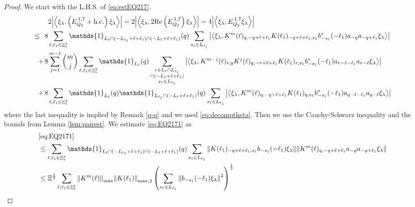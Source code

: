 \documentclass[12pt,a4paper]{article}
\numberwithin{equation}{section}
\newcommand{\1}{\mathbb{I}}
\DeclareMathOperator{\Z}{\mathbb{Z}}
\newcommand{\half}{\frac{1}{2}}
\newcommand{\eva}[1]{\left\langle #1 \right\rangle}
\theoremstyle{plain}
\theoremstyle{definition}
\theoremstyle{remark}
\theoremstyle{plain}
\theoremstyle{definition}
\theoremstyle{remark}
\begin{document}
\begin{proof}
 We start with the L.H.S. of \eqref{eq:estEQ217}.
\begin{align}
	&2\abs{\eva{\xi_\lambda,\left(E^{\,1,7}_{Q_2}+\mathrm{h.c.}\right) \xi_\lambda }} =2 \abs{\eva{\xi_\lambda,2\mathrm{Re}\left(E^{\,1,7}_{Q_2}\right) \xi_\lambda }} = 4\abs{\eva{\xi_\lambda, E^{\,1,7}_{Q_2} \xi_\lambda }}\nonumber\\
	\leq\,\;8& \sum\limits_{\ell, \ell_1\in \Z^3_*} \mathds{1}_{L_{\ell} \cap (-L_{\ell_1}+\ell+\ell_1) \cap (-L_{\ell}+\ell+\ell_1)}(q) \sum\limits_{s_1 \in L_{\ell_1}} \abs{\eva{\xi_\lambda, K^m(\ell)_{q,-q+\ell+\ell_1} K(\ell_1)_{-q+\ell+\ell_1,s_1} b^*_{-s_1}(-\ell_1) a_{-q} a_{-q+\ell_1} \xi_\lambda}} \label{eq:EQ2171}\\
	+\,8& \sum\limits_{j=1}^{m-1} {{m}\choose j} \sum\limits_{\ell, \ell_1\in \Z^3_*}\mathds{1}_{L_{\ell}}(q) \sum\limits_{\substack{r\in L_{\ell} \cap L_{\ell_1} \\ \cap (-L_{\ell}+\ell+\ell_1)\\s_1\in L_{\ell_1}}}  \abs{\eva{\xi_\lambda, K^{m-j}(\ell)_{r,q} K^j(\ell)_{q,-r+\ell+\ell_1} K(\ell_1)_{r,s_1} b^*_{-s_1}(-\ell_1)a_{r-\ell-\ell_1}a_{r-\ell} \xi_\lambda }} \label{eq:EQ2172}\\
	+\,8&\sum\limits_{\ell, \ell_1\in \Z^3_*} \mathds{1}_{L_{\ell}}(q) \mathds{1}_{L_{\ell_1}\cap (-L_{\ell}+\ell+\ell_1)}(q) \sum\limits_{s_1\in L_{\ell_1}} \abs{\eva{\xi_\lambda, K^m(\ell)_{q,-q+\ell+\ell_1} K(\ell_1)_{q,s_1} b^*_{-s_1}(-\ell_1)a_{q-\ell-\ell_1}a_{q-\ell} \xi_\lambda }} \label{eq:EQ2173}
\end{align}
where the last inequality is implied by Remark \ref{q-q} and we used \eqref{eq:decomptheta}.
Then we use the Cauchy-Schwarz inequality and the bounds from Lemma \ref{lem:pairest}.
We estimate \eqref{eq:EQ2171} as 
\begin{align}
	&\eqref{eq:EQ2171}\nonumber\\
	&\leq \sum\limits_{\ell, \ell_1\in \Z^3_*} \mathds{1}_{L_{\ell} \cap (-L_{\ell_1}+\ell+\ell_1) \cap (-L_{\ell}+\ell+\ell_1)}(q) \sum\limits_{s_1 \in L_{\ell_1}} \norm{  K(\ell_1)_{-q+\ell+\ell_1,s_1} b_{-s_1}(-\ell_1) \xi_\lambda}\norm{ K^m(\ell)_{q,-q+\ell+\ell_1}a_{-q}a_{-q+\ell_1} \xi_\lambda }\nonumber\\
	&\leq \Xi^\half \sum\limits_{\ell, \ell_1\in \Z^3_*}  \norm{K^m(\ell)}_{\max} \norm{K(\ell_1)}_{\mathrm{max,2}} \left(\sum\limits_{s_1 \in L_{\ell_1}} \norm{ b_{-s_1}(-\ell_1) \xi_\lambda}^2\right)^\half\nonumber\\

\end{align}
\end{proof}
\end{document}
